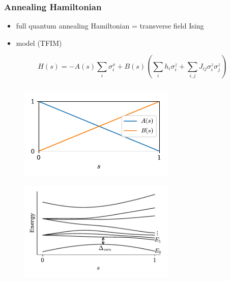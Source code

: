 \documentclass[11pt]{beamer}
\newcommand{\itemb}{\item[$\bullet$]}
\begin{document}
\begin{frame}
    \frametitle{Annealing Hamiltonian}
    \begin{itemize}
        \setlength{\itemindent}{-1em}
        \itemb full quantum annealing Hamiltonian = transverse field Ising 
        \item [] model (TFIM)
    \end{itemize}
    \begin{equation*}
        H(s) = - A(s) \sum_i \sigma^x_i + B(s) \left( \sum_i h_i \sigma^z_i + \sum_{i,j} J_{ij} \sigma^z_i \sigma^z_j \right)
    \end{equation*}
    \begin{columns}
        \begin{column}{0.6\textwidth}
            \vspace*{-1.5em}
            \begin{figure}[!htb]
                \includegraphics[width=0.7\textwidth]{../plots/interpolating_functions.pdf}
            \end{figure}
            \vspace*{-3em}
            \begin{figure}[!htb]
                \includegraphics[width=0.7\textwidth]{../plots/ising_gap.pdf}
            \end{figure}
        \end{column}
        \begin{column}{0.4\textwidth}

\end{column}
\end{columns}
\end{frame}
\end{document}
